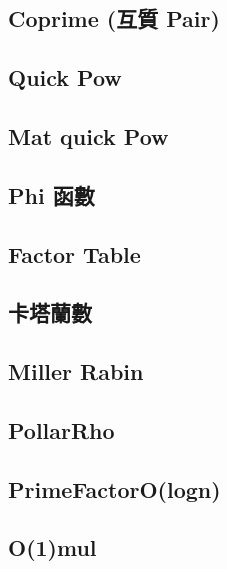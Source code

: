 \subsection{Coprime (互質 Pair)}


\subsection{Quick Pow}


\subsection{Mat quick Pow}


\subsection{Phi 函數}


\subsection{Factor Table}


\subsection{卡塔蘭數}


\subsection{Miller Rabin}


\subsection{PollarRho}


\subsection{PrimeFactorO(logn)}


\subsection{O(1)mul}


